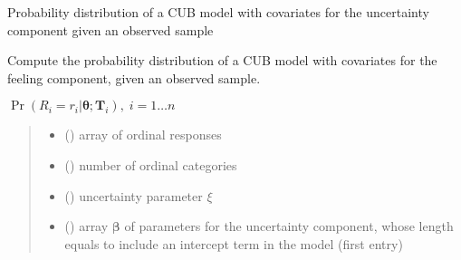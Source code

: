\documentclass[letterpaper,10pt,english]{sphinxmanual}
\begin{document}

\begin{fulllineitems}
\label{\detokenize{cubmods:cubmods.cub_y0.prob}}
\pysigstartsignatures
{}
\pysigstopsignatures
\sphinxAtStartPar
Probability distribution of a CUB model with covariates for the uncertainty component
given an observed sample

\sphinxAtStartPar
Compute the probability distribution of a CUB model with covariates
for the feeling component, given an observed sample.

\sphinxAtStartPar
\(\Pr(R_i=r_i|\pmb\theta;\pmb T_i),\; i=1 \ldots n\)
\begin{quote}\begin{description}
\begin{itemize}
\item {} 
\sphinxAtStartPar
{} () \textendash{} array of ordinal responses

\item {} 
\sphinxAtStartPar
{} () \textendash{} number of ordinal categories

\item {} 
\sphinxAtStartPar
{} () \textendash{} uncertainty parameter \(\xi\)

\item {} 
\sphinxAtStartPar
{} () \textendash{} array \(\pmb \beta\) of parameters for the uncertainty component, whose length equals 
 to include an intercept term in the model (first entry)


\end{itemize}
\end{description}
\end{quote}
\end{fulllineitems}
\end{document}
